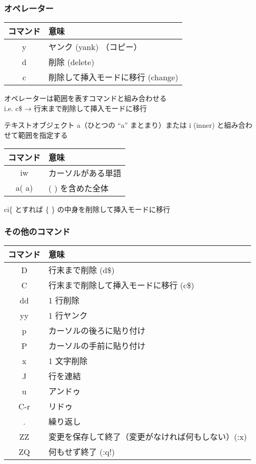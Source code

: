\documentclass[unicode,aspectratio=1610,colorlinks,handout]{beamer}
\begin{document}
\begin{frame}
	\frametitle{オペレーター}
	\begin{center}
		\begin{tabular}{cl}
			コマンド&意味\\
			\hline
			y&ヤンク (yank) （コピー）\\
			d&削除 (delete)\\
			c&削除して挿入モードに移行 (change)
		\end{tabular}
	\end{center}
	
	オペレーターは範囲を表すコマンドと組み合わせる\\
	i.e. c\$ → 行末まで削除して挿入モードに移行
	
	\begin{block}{テキストオブジェクト}
		a（ひとつの ``a'' まとまり）または i (inner) と組み合わせて範囲を指定する
		\begin{center}
			\begin{tabular}{cl}
				コマンド&意味\\
				\hline
				iw&カーソルがある単語\\
				a( a)&( ) を含めた全体
			\end{tabular}
		\end{center}
		
		ci\{ とすれば \{ \} の中身を削除して挿入モードに移行
	\end{block}
\end{frame}

\begin{frame}
	\frametitle{その他のコマンド}
	\begin{center}
		\begin{tabular}{cl}
			コマンド&意味\\
			\hline
			D&行末まで削除 (d\$)\\
			C&行末まで削除して挿入モードに移行 (c\$)\\
			dd&1 行削除\\
			yy&1 行ヤンク\\
			p&カーソルの後ろに貼り付け\\
			P&カーソルの手前に貼り付け\\
			x&1 文字削除\\
			J&行を連結\\
			u&アンドゥ\\
			C-r&リドゥ\\
			.&繰り返し\\
			ZZ&変更を保存して終了（変更がなければ何もしない）(:x)\\
			ZQ&何もせず終了 (:q!)
		\end{tabular}
	\end{center}
\end{frame}
\end{document}
